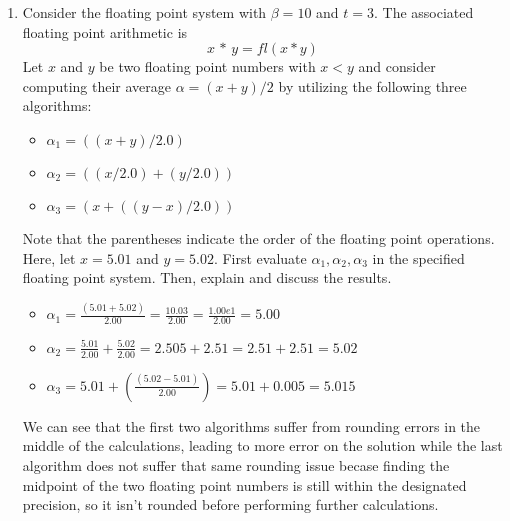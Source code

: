 \documentclass[10pt]{article}
\begin{document}
\begin{enumerate}
\item Consider the floating point system with $\beta = 10$ and $t = 3$. The associated floating point arithmetic is
	\begin{equation*}
		x\, \boxed{*}\, y = fl(x * y)
	\end{equation*}
	Let $x$ and $y$ be two floating point numbers with $x < y$ and consider computing their average $\alpha = (x+y)/2$ by utilizing the following three algorithms:
	\begin{itemize}
		\item $\alpha_{1} = ((x+y)/2.0)$
		\item $\alpha_{2} = ((x/2.0) + (y/2.0))$
		\item $\alpha_{3} = (x + ((y-x)/2.0))$
	\end{itemize}
	Note that the parentheses indicate the order of the floating point operations. Here, let $x = 5.01$ and $y=5.02$. First evaluate $\alpha_{1}, \alpha_{2}, \alpha_{3}$ in the specified floating point system. Then, explain and discuss the results.
	\begin{itemize}
		\item $\alpha_{1} = \frac{(5.01+5.02)}{2.00} = \frac{10.03}{2.00} = \frac{1.00e1}{2.00} = 5.00$
		\item $\alpha_{2} = \frac{5.01}{2.00} + \frac{5.02}{2.00} = 2.505 + 2.51 = 2.51 + 2.51 = 5.02$
		\item $\alpha_{3} = 5.01 + \left(\frac{(5.02 - 5.01)}{2.00}\right) = 5.01 + 0.005 = 5.015$
	\end{itemize}
	We can see that the first two algorithms suffer from rounding errors in the middle of the calculations, leading to more error on the solution while the last algorithm does not suffer that same rounding issue becase finding the midpoint of the two floating point numbers is still within the designated precision, so it isn't rounded before performing further calculations.
	\pagebreak



\end{enumerate}
\end{document}

